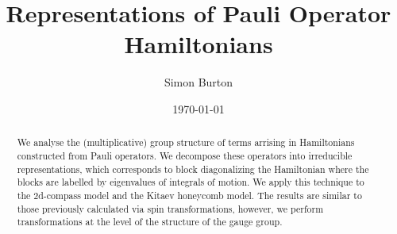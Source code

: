 \documentclass[12pt,notitlepage,longbibliography,nofootinbib,tightenlines]{revtex4}
\begin{document}
\title{Representations of Pauli Operator Hamiltonians}

\author{Simon Burton}

\date{\today}


\begin{abstract}
We analyse the (multiplicative) group structure of terms arrising
in Hamiltonians constructed from Pauli operators.
We decompose these operators into irreducible 
representations, which corresponds to block diagonalizing
the Hamiltonian where the blocks are labelled by
eigenvalues of integrals of motion.
We apply this technique to the 2d-compass model
and the Kitaev honeycomb model.
The results are similar to those previously 
calculated via spin transformations,
however, we perform transformations at
the level of the structure of the gauge group.
\end{abstract}

\maketitle


\def\Complex{\mathbb{C}}
\def\Z{\mathbb{Z}}
\def\Ham{\mathcal{H}}
\def\Pauli{\mathcal{P}}
\def\Spec{\mbox{Spec}}
\def\Proveit{{\it (Proof??)}}
\def\GL{\mathrm{GL}}
\def\half{\frac{1}{2}}
\def\Stab{S}


%
%


\end{document}
